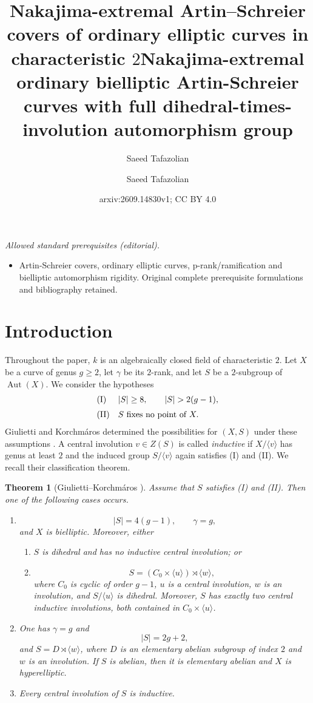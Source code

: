 \documentclass[11pt]{article}
\title{Nakajima-extremal Artin--Schreier covers of ordinary elliptic curves in characteristic $2$}
\author{Saeed Tafazolian}
\date{}
\title{Nakajima-extremal ordinary bielliptic Artin-Schreier curves with full dihedral-times-involution automorphism group}
\author{Saeed Tafazolian}
\date{arxiv:2609.14830v1; CC BY 4.0}
\newtheorem{theorem}{Theorem}[section]
\theoremstyle{remark}
\newcommand{\Aut}{\operatorname{Aut}}
\begin{document}
\maketitle
\noindent\textit{Allowed standard prerequisites (editorial).}\begin{itemize}
\item Artin-Schreier covers, ordinary elliptic curves, p-rank/ramification and bielliptic automorphism rigidity. Original complete prerequisite formulations and bibliography retained.
\end{itemize}\medskip
\section{Introduction}

Throughout the paper, $k$ is an algebraically closed field of
characteristic $2$.  Let $X$ be a curve of genus $g\ge2$, let $\gamma$
be its $2$-rank, and let $S$ be a $2$-subgroup of $\Aut(X)$.  We consider
the hypotheses
\[
\begin{array}{ll}
\textup{(I)}  & |S|\ge8,\qquad |S|>2(g-1),\\[2mm]
\textup{(II)} & S\text{ fixes no point of }X.
\end{array}
\]
Giulietti and Korchm\'aros determined the possibilities for $(X,S)$
under these assumptions \cite{GK2015}.  A central involution $v\in Z(S)$
is called \emph{inductive} if $X/\langle v\rangle$ has genus at least $2$
and the induced group $S/\langle v\rangle$ again satisfies
\textup{(I)} and \textup{(II)}.  We recall their classification theorem.

\begin{theorem}[Giulietti--Korchm\'aros {\cite[Theorem~1.2]{GK2015}}]
\label{thm:GKclassification}
Assume that $S$ satisfies \textup{(I)} and \textup{(II)}.  Then one of
the following cases occurs.
\begin{enumerate}[label=\textup{(\roman*)}]
\item
\[
        |S|=4(g-1),\qquad \gamma=g,
\]
and $X$ is bielliptic.  Moreover, either
\begin{enumerate}[label=\textup{(i\alph*)}]
\item $S$ is dihedral and has no inductive central involution; or
\item
\[
        S=(C_0\times\langle u\rangle)\rtimes\langle w\rangle,
\]
where $C_0$ is cyclic of order $g-1$, $u$ is a central involution,
$w$ is an involution, and $S/\langle u\rangle$ is dihedral.  Moreover,
$S$ has exactly two central inductive involutions, both contained in
$C_0\times\langle u\rangle$.
\end{enumerate}
\item One has $\gamma=g$ and
\[
        |S|=2g+2,
\]
and $S=D\rtimes\langle w\rangle$, where $D$ is an elementary abelian
subgroup of index $2$ and $w$ is an involution.  If $S$ is abelian,
then it is elementary abelian and $X$ is hyperelliptic.
\item Every central involution of $S$ is inductive.
\end{enumerate}
\end{theorem}
\end{document}

